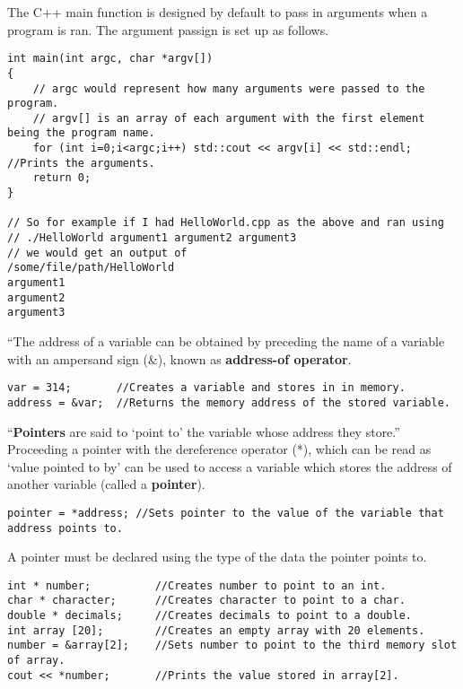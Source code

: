 The C++ main function is designed by default to pass in arguments when a program is ran. The argument passign is set up as follows.
\begin{lstlisting}
int main(int argc, char *argv[])
{
	// argc would represent how many arguments were passed to the program.
	// argv[] is an array of each argument with the first element being the program name.
	for (int i=0;i<argc;i++) std::cout << argv[i] << std::endl; //Prints the arguments.
	return 0;
}

// So for example if I had HelloWorld.cpp as the above and ran using
// ./HelloWorld argument1 argument2 argument3
// we would get an output of 
/some/file/path/HelloWorld
argument1
argument2
argument3
\end{lstlisting}

``The address of a variable can be obtained by preceding the name of a variable with an ampersand sign (\&), known as \textbf{address-of operator}. \cite{cpp:pointers}
\begin{lstlisting}
var = 314;       //Creates a variable and stores in in memory.
address = &var;  //Returns the memory address of the stored variable.
\end{lstlisting}

``\textbf{Pointers} are said to `point to' the variable whose address they store.'' \cite{cpp:pointers} Proceeding a pointer with the dereference operator (*), which can be read as `value pointed to by' can be used to access a variable which stores the address of another variable (called a \textbf{pointer}).
\begin{lstlisting}
pointer = *address; //Sets pointer to the value of the variable that address points to.
\end{lstlisting}

A pointer must be declared using the type of the data the pointer points to.
\begin{lstlisting}
int * number;          //Creates number to point to an int.
char * character;      //Creates character to point to a char.
double * decimals;     //Creates decimals to point to a double.
int array [20];        //Creates an empty array with 20 elements.
number = &array[2];    //Sets number to point to the third memory slot of array.
cout << *number;       //Prints the value stored in array[2].
\end{lstlisting}

